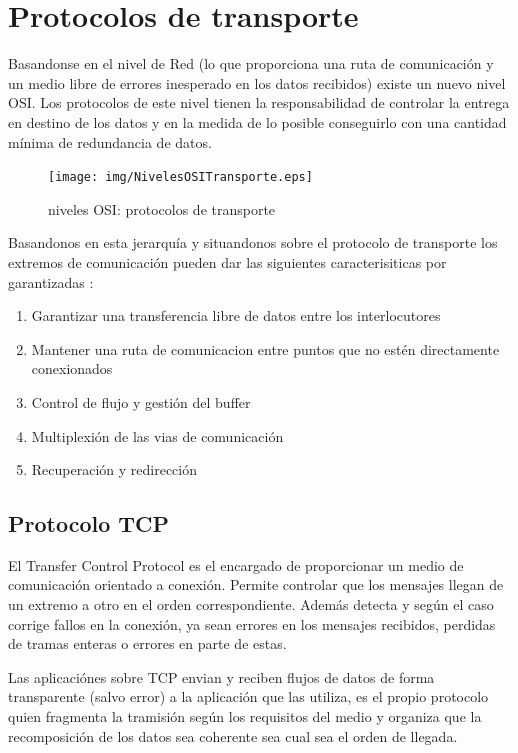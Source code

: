 \documentclass[a4paper,spanish,12pt]{book}
\begin{document}
\section{Protocolos de transporte}

Basandonse en el nivel de Red (lo que proporciona una ruta de comunicación y un medio libre de errores inesperado en los datos recibidos) existe un nuevo nivel OSI. Los protocolos de este nivel tienen la responsabilidad de controlar la entrega en destino de los datos y en la medida de lo posible conseguirlo con una cantidad mínima de redundancia de datos.

\begin{figure}
	\texttt{[image: img/NivelesOSITransporte.eps]}	
              \caption{niveles OSI: protocolos de transporte}
  \label{fig:nivelesOSITransporte}
\end{figure}

Basandonos en esta jerarquía y situandonos sobre el protocolo de transporte los extremos de comunicación pueden dar las siguientes caracterisiticas por garantizadas :
\begin{enumerate}
	\item{Garantizar una transferencia libre de datos entre los interlocutores}
	\item{Mantener una ruta de comunicacion entre puntos que no est\'en directamente conexionados}
	\item{Control de flujo y gestión del buffer}
	\item{Multiplexión de las vias de comunicación}
	\item{Recuperación y redirección}
\end{enumerate}
\subsection{Protocolo TCP}
El Transfer Control Protocol es el encargado de proporcionar un medio de comunicación orientado a conexión. Permite controlar que los mensajes llegan de un extremo a otro en el orden correspondiente. Además detecta y según el caso corrige fallos en la conexión, ya sean errores en los mensajes recibidos, perdidas de tramas enteras o errores en parte de estas.

Las aplicaciónes sobre TCP envian y reciben flujos de datos de forma transparente (salvo error) a la aplicación que las utiliza, es el propio protocolo quien fragmenta la tramisión según los requisitos del medio y organiza que la recomposición de los datos sea coherente sea cual sea el orden de llegada.
\end{document}

